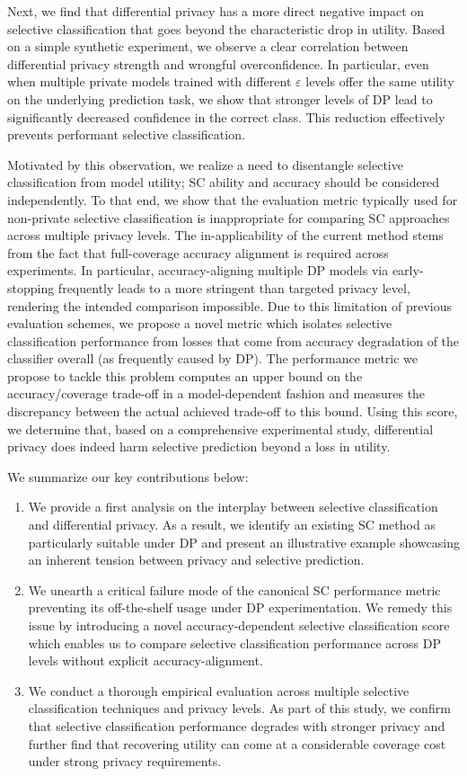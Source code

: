 Next, we find that differential privacy has a more direct negative impact on selective classification that goes beyond the characteristic drop in utility. Based on a simple synthetic experiment, we observe a clear correlation between differential privacy strength and wrongful overconfidence. In particular, even when multiple private models trained with different $\varepsilon$ levels offer the same utility on the underlying prediction task, we show that stronger levels of DP lead to significantly decreased confidence in the correct class. This reduction effectively prevents performant selective classification. 

Motivated by this observation, we realize a need to disentangle selective classification from model utility; SC ability and accuracy should be considered independently. To that end, we show that the evaluation metric typically used for non-private selective classification is inappropriate for comparing SC approaches across multiple privacy levels. The in-applicability of the current method stems from the fact that full-coverage accuracy alignment is required across experiments. In particular, accuracy-aligning multiple DP models via early-stopping frequently leads to a more stringent than targeted privacy level, rendering the intended comparison impossible. Due to this limitation of previous evaluation schemes, we propose a novel metric which isolates selective classification performance from losses that come from accuracy degradation of the classifier overall (as frequently caused by DP). The performance metric we propose to tackle this problem computes an upper bound on the accuracy/coverage trade-off in a model-dependent fashion and measures the discrepancy between the actual achieved trade-off to this bound. Using this score, we determine that, based on a comprehensive experimental study, differential privacy does indeed harm selective prediction beyond a loss in utility.

We summarize our key contributions below: 
\begin{enumerate}[leftmargin=15pt]
     \item We provide a first analysis on the interplay between selective classification and differential privacy. As a result, we identify an existing SC method as particularly suitable under DP and present an illustrative example showcasing an inherent tension between privacy and selective prediction. 
     \item We unearth a critical failure mode of the canonical SC performance metric preventing its off-the-shelf usage under DP experimentation. We remedy this issue by introducing a novel accuracy-dependent selective classification score which enables us to compare selective classification performance across DP levels without explicit accuracy-alignment.
     \item We conduct a thorough empirical evaluation across multiple selective classification techniques and privacy levels. As part of this study, we confirm that selective classification performance degrades with stronger privacy and further find that recovering utility can come at a considerable coverage cost under strong privacy requirements.
\end{enumerate}

